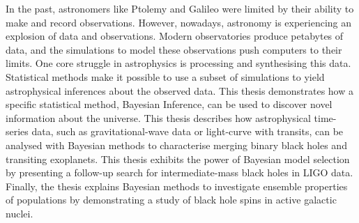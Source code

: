 {In the past, astronomers like Ptolemy and Galileo were limited by their ability to make and record observations.
However, nowadays, astronomy is experiencing an explosion of data and observations.
Modern observatories produce petabytes of data, and the simulations to model these observations push computers to their limits.
One core struggle in astrophysics is processing and synthesising this data.
Statistical methods make it possible to use a subset of simulations to yield astrophysical inferences about the observed data.
This thesis demonstrates how a specific statistical method, Bayesian Inference, can be used to discover novel information about the universe.
This thesis describes how astrophysical time-series data, such as gravitational-wave data or light-curve with transits, can be analysed with Bayesian methods to characterise merging binary black holes and transiting exoplanets.
This thesis exhibits the power of Bayesian model selection by presenting a follow-up search for intermediate-mass black holes in LIGO data.
Finally, the thesis explains Bayesian methods to investigate ensemble properties of populations by demonstrating a study of black hole spins in active galactic nuclei.



}
